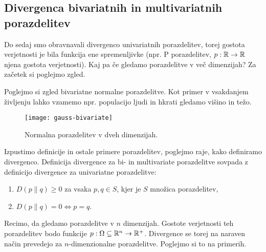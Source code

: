 \subsection{Divergenca bivariatnih in multivariatnih porazdelitev}

Do sedaj smo obravnavali divergenco univariatnih porazdelitev, torej gostota verjetnosti je bila funkcija ene spremenljivke (npr. P porazdelitev, $p: \mathbb{R} \rightarrow \mathbb{R}$ njena gostota verjetnosti). Kaj pa če gledamo porazdelitve v več dimenzijah? Za začetek si poglejmo zgled.

\begin{zgled}
    Poglejmo si zgled bivariatne normalne porazdelitve. Kot primer v vsakdanjem življenju lahko vzamemo npr. populacijo ljudi in hkrati gledamo višino in težo.
    \begin{figure}[!ht]
        \centering
        \texttt{[image: gauss-bivariate]}
        \caption{Normalna porazdelitev v dveh dimenzijah.}
    \end{figure}
\end{zgled}

Izpustimo definicije in ostale primere porazdelitev, poglejmo raje, kako definiramo divergenco.
\pagebreak
Definicija divergence za bi- in multivariate porazdelitve sovpada z definicijo divergence za univariatne porazdelitve:
\begin{enumerate}
	\item $D(p \| q) \geq 0$ za vsaka $p, q \in S$, kjer je $S$ množica porazdelitev,
	\item $D(p \| q) = 0 \Leftrightarrow p = q$.
\end{enumerate}

Recimo, da gledamo porazdelitve v $n$ dimenzijah. Gostote verjetnosti teh porazdelitev bodo funkcije $p: \Omega \subseteq \mathbb{R}^n \rightarrow \mathbb{R}^+$. Divergence se torej na naraven način prevedejo za $n$-dimenzionalne porazdelitve. Poglejmo si to na primerih.

